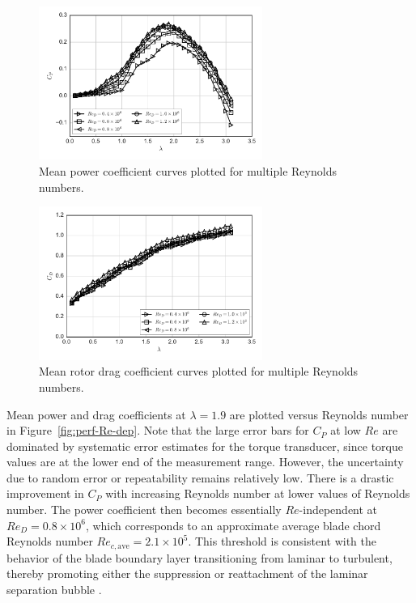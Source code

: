 \documentclass[energies,article,accept,moreauthors,pdftex,12pt,a4paper]{mdpi}
\begin{document}
\begin{figure}[ht]
\centering

\includegraphics[width=0.65\textwidth]{figures/cp_curves}

\caption{Mean power coefficient curves plotted for multiple Reynolds numbers.}

\label{fig:cp-curves}
\end{figure}

\begin{figure}[ht]
\centering

\includegraphics[width=0.65\textwidth]{figures/cd_curves}

\caption{Mean rotor drag coefficient curves plotted for multiple Reynolds
    numbers.}

\label{fig:cd-curves}
\end{figure}

Mean power and drag coefficients at $\lambda=1.9$ are plotted versus Reynolds
number in Figure~\ref{fig:perf-Re-dep}. Note that the large error bars for $C_P$
at low $Re$ are dominated by systematic error estimates for the torque
transducer, since torque values are at the lower end of the measurement range.
However, the uncertainty due to random error or repeatability remains relatively
low. There is a drastic improvement in $C_P$ with increasing Reynolds number at
lower values of Reynolds number. The power coefficient then becomes  essentially
$Re$-independent at $Re_D = 0.8 \times 10^6$, which corresponds to an
approximate average blade chord Reynolds number $Re_{c, \mathrm{ave}} = 2.1
\times 10^5$. This threshold is consistent with the behavior of the blade
boundary layer transitioning from laminar to turbulent, thereby promoting either
the suppression or reattachment of the laminar separation bubble
\cite{Lissaman1983}.
\end{document}
